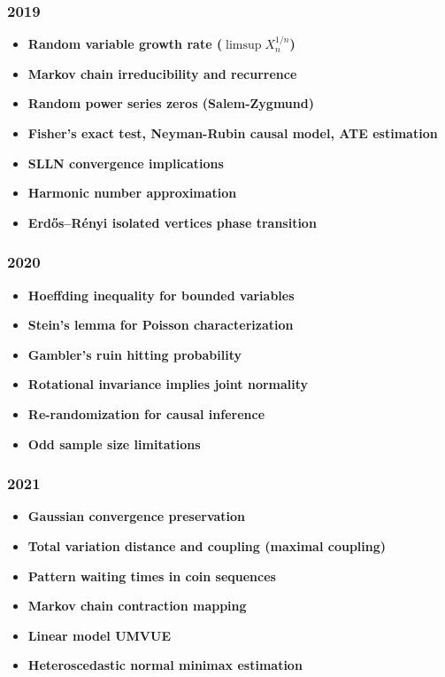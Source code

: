 \subsubsection*{2019}
\begin{itemize}
    \item \textbf{Random variable growth rate ($\limsup X_n^{1/n}$)}
    \item \textbf{Markov chain irreducibility and recurrence}
    \item \textbf{Random power series zeros (Salem-Zygmund)}
    \item \textbf{Fisher's exact test, Neyman-Rubin causal model, ATE estimation}
    \item \textbf{SLLN convergence implications}
    \item \textbf{Harmonic number approximation}
    \item \textbf{Erd\H{o}s--R\'enyi isolated vertices phase transition}
\end{itemize}

\subsubsection*{2020}
\begin{itemize}
    \item \textbf{Hoeffding inequality for bounded variables}
    \item \textbf{Stein's lemma for Poisson characterization}
    \item \textbf{Gambler's ruin hitting probability}
    \item \textbf{Rotational invariance implies joint normality}
    \item \textbf{Re-randomization for causal inference}
    \item \textbf{Odd sample size limitations}
\end{itemize}

\subsubsection*{2021}
\begin{itemize}
    \item \textbf{Gaussian convergence preservation}
    \item \textbf{Total variation distance and coupling (maximal coupling)}
    \item \textbf{Pattern waiting times in coin sequences}
    \item \textbf{Markov chain contraction mapping}
    \item \textbf{Linear model UMVUE}
    \item \textbf{Heteroscedastic normal minimax estimation}
\end{itemize}

